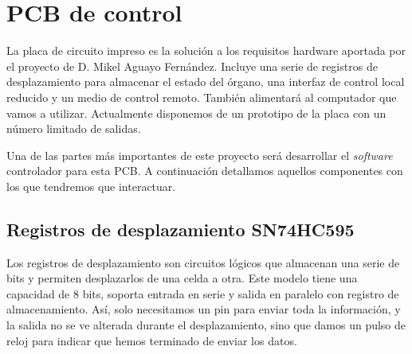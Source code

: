 \smallskip

\section{PCB de control}

La placa de circuito impreso es la solución a los requisitos hardware aportada por el proyecto de D. Mikel Aguayo Fernández. Incluye una serie de registros de desplazamiento para almacenar el estado del órgano, una interfaz de control local reducido y un medio de control remoto. También alimentará al computador que vamos a utilizar. Actualmente disponemos de un prototipo de la placa con un número limitado de salidas.

Una de las partes más importantes de este proyecto será desarrollar el \textit{software} controlador para esta PCB. A continuación detallamos aquellos componentes con los que tendremos que interactuar.

\subsection{Registros de desplazamiento SN74HC595}

Los registros de desplazamiento son circuitos lógicos que almacenan una serie de bits y permiten desplazarlos de una celda a otra. Este modelo tiene una capacidad de 8 bits, soporta entrada en serie y salida en paralelo con registro de almacenamiento. Así, solo necesitamos un pin para enviar toda la información, y la salida no se ve alterada durante el desplazamiento, sino que damos un pulso de reloj para indicar que hemos terminado de enviar los datos.

\smallskip

